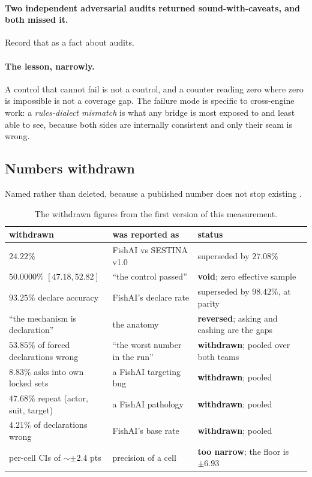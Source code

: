 \documentclass[11pt]{article}
\begin{document}
\paragraph{Two independent adversarial audits returned sound-with-caveats, and both missed it.}
Record that as a fact about audits.

\paragraph{The lesson, narrowly.} A control that cannot fail is not a control, and a counter reading
zero where zero is impossible is not a coverage gap. The failure mode is specific to cross-engine
work: a \emph{rules-dialect mismatch} is what any bridge is most exposed to and least able to see,
because both sides are internally consistent and only their seam is wrong.

\subsection{Numbers withdrawn}
\label{sec:withdrawn}

Named rather than deleted, because a published number does not stop existing \cite{crossplay}.

\begin{table}[t]
\centering
\caption{The withdrawn figures from the first version of this measurement.}
\label{tab:withdrawn}
\footnotesize
\begin{tabular}{@{}p{}p{}p{}@{}}
\toprule
withdrawn & was reported as & status \\
\midrule
$24.22\%$ & FishAI vs SESTINA v1.0 & superseded by $\mathbf{27.08\%}$ \\
$50.0000\%$ $[47.18, 52.82]$ & ``the control passed'' & \textbf{void}; zero effective sample \\
$93.25\%$ declare accuracy & FishAI's declare rate & superseded by $98.42\%$, at parity \\
``the mechanism is declaration'' & the anatomy & \textbf{reversed}; asking and cashing are the gaps \\
$53.85\%$ of forced declarations wrong & ``the worst number in the run'' & \textbf{withdrawn}; pooled over both teams \\
$8.83\%$ asks into own locked sets & a FishAI targeting bug & \textbf{withdrawn}; pooled \\
$47.68\%$ repeat (actor, suit, target) & a FishAI pathology & \textbf{withdrawn}; pooled \\
$4.21\%$ of declarations wrong & FishAI's base rate & \textbf{withdrawn}; pooled \\
per-cell CIs of ${\sim}\pm2.4$ pts & precision of a cell & \textbf{too narrow}; the floor is $\pm 6.93$ \\
\bottomrule
\end{tabular}
\end{table}
\end{document}
